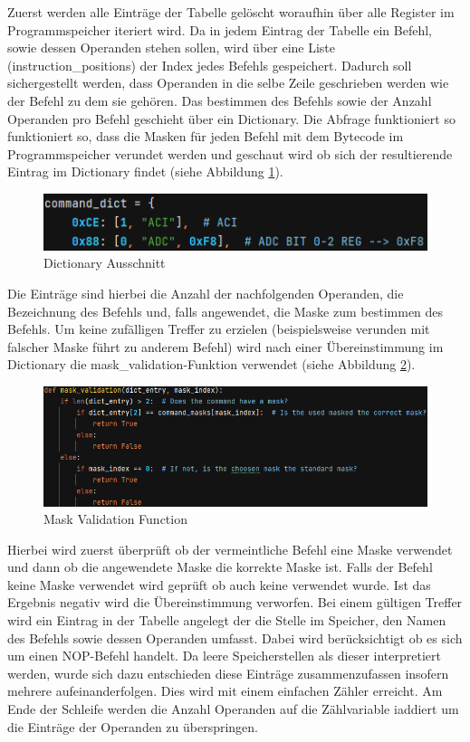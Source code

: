 \documentclass[12pt]{article}
\newcommand{\imgSpaceBefore}{\vspace{10pt}}
\begin{document}
\noindent
Zuerst werden alle Einträge der Tabelle gelöscht woraufhin über alle Register im Programmspeicher iteriert wird. Da in jedem Eintrag der Tabelle ein Befehl, sowie dessen Operanden stehen sollen, wird über eine Liste (instruction\_positions) der Index jedes Befehls gespeichert. Dadurch soll sichergestellt werden, dass Operanden in die selbe Zeile geschrieben werden wie der Befehl zu dem sie gehören. Das bestimmen des Befehls sowie der Anzahl Operanden pro Befehl geschieht über ein Dictionary. Die Abfrage funktioniert so funktioniert so, dass die Masken für jeden Befehl mit dem Bytecode im Programmspeicher verundet werden und geschaut wird ob sich der resultierende Eintrag im Dictionary findet (siehe Abbildung \ref{fig:Dict}).\imgSpaceBefore

\begin{figure}[H]
\centering
\includegraphics[width=12cm]{bilder/CmdDictExample}
\caption{Dictionary Ausschnitt}
\label{fig:Dict}
\end{figure}

\noindent
Die Einträge sind hierbei die Anzahl der nachfolgenden Operanden, die Bezeichnung des Befehls und, falls angewendet, die Maske zum bestimmen des Befehls. Um keine zufälligen Treffer zu erzielen (beispielsweise verunden mit falscher Maske führt zu anderem Befehl) wird nach einer Übereinstimmung im Dictionary die \glqq mask\_validation\grqq-Funktion verwendet (siehe Abbildung \ref{fig:MaskValid}).\imgSpaceBefore

\begin{figure}[H]
\centering
\includegraphics[width=14cm]{bilder/mask_valid}
\caption{Mask Validation Function}
\label{fig:MaskValid}
\end{figure}

\noindent
Hierbei wird zuerst überprüft ob der vermeintliche Befehl eine Maske verwendet und dann ob die angewendete Maske die korrekte Maske ist. Falls der Befehl keine Maske verwendet wird geprüft ob auch keine verwendet wurde. Ist das Ergebnis negativ wird die Übereinstimmung verworfen. Bei einem gültigen Treffer wird ein Eintrag in der Tabelle angelegt der die Stelle im Speicher, den Namen des Befehls sowie dessen Operanden umfasst. Dabei wird berücksichtigt ob es sich um einen NOP-Befehl handelt. Da leere Speicherstellen als dieser interpretiert werden, wurde sich dazu entschieden diese Einträge zusammenzufassen insofern mehrere aufeinanderfolgen. Dies wird mit einem einfachen Zähler erreicht. Am Ende der Schleife werden die Anzahl Operanden auf die Zählvariable \glqq i\grqq addiert um die Einträge der Operanden zu überspringen.
\end{document}
